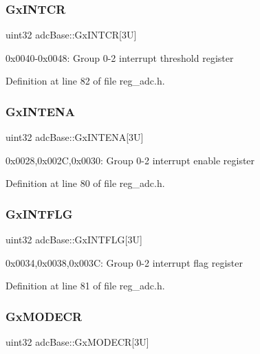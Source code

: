 \subsubsection{\texorpdfstring{Gx\+I\+N\+T\+CR}{GxINTCR}}
{\footnotesize\ttfamily uint32 adc\+Base\+::\+Gx\+I\+N\+T\+CR\mbox{[}3\+U\mbox{]}}

0x0040-\/0x0048\+: Group 0-\/2 interrupt threshold register 

Definition at line 82 of file reg\+\_\+adc.\+h.

\mbox{\label{structadcBase_ad829b4c11b40bbc1f677552ee9b4d0a0}} 
\subsubsection{\texorpdfstring{Gx\+I\+N\+T\+E\+NA}{GxINTENA}}
{\footnotesize\ttfamily uint32 adc\+Base\+::\+Gx\+I\+N\+T\+E\+NA\mbox{[}3\+U\mbox{]}}

0x0028,0x002C,0x0030\+: Group 0-\/2 interrupt enable register 

Definition at line 80 of file reg\+\_\+adc.\+h.

\mbox{\label{structadcBase_a9e8165173cd3a6b357f03bd82da48c5e}} 
\subsubsection{\texorpdfstring{Gx\+I\+N\+T\+F\+LG}{GxINTFLG}}
{\footnotesize\ttfamily uint32 adc\+Base\+::\+Gx\+I\+N\+T\+F\+LG\mbox{[}3\+U\mbox{]}}

0x0034,0x0038,0x003C\+: Group 0-\/2 interrupt flag register 

Definition at line 81 of file reg\+\_\+adc.\+h.

\mbox{\label{structadcBase_a2e1b07b4a4782710b38211aa986c8199}} 
\subsubsection{\texorpdfstring{Gx\+M\+O\+D\+E\+CR}{GxMODECR}}
{\footnotesize\ttfamily uint32 adc\+Base\+::\+Gx\+M\+O\+D\+E\+CR\mbox{[}3\+U\mbox{]}}

